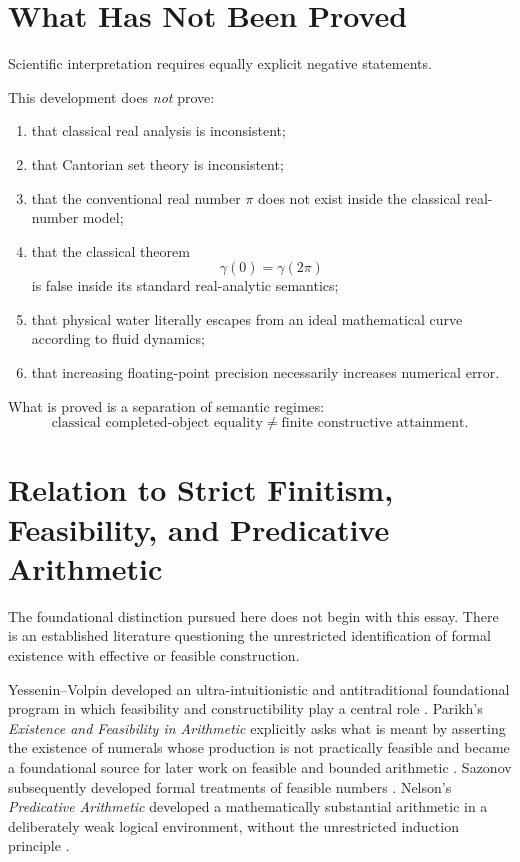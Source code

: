 \documentclass[11pt,a4paper]{article}
\begin{document}
\section{What Has Not Been Proved}

Scientific interpretation requires equally explicit negative statements.

This development does \emph{not} prove:

\begin{enumerate}[label=\arabic*.]
\item that classical real analysis is inconsistent;

\item that Cantorian set theory is inconsistent;

\item that the conventional real number $\pi$ does not exist inside the
      classical real-number model;

\item that the classical theorem
      \[
      \gamma(0)=\gamma(2\pi)
      \]
      is false inside its standard real-analytic semantics;

\item that physical water literally escapes from an ideal mathematical
      curve according to fluid dynamics;

\item that increasing floating-point precision necessarily increases
      numerical error.
\end{enumerate}

What is proved is a separation of semantic regimes:
\[
\boxed{
\text{classical completed-object equality}
\neq
\text{finite constructive attainment}.
}
\]




\section{Relation to Strict Finitism, Feasibility, and Predicative Arithmetic}
\label{sec:prior-ultrafinitist-literature}

The foundational distinction pursued here does not begin with this
essay.  There is an established literature questioning the unrestricted
identification of formal existence with effective or feasible
construction.

Yessenin--Volpin developed an ultra-intuitionistic and
antitraditional foundational program in which feasibility and
constructibility play a central role
\cite{YesseninVolpin1970}.
Parikh's \emph{Existence and Feasibility in Arithmetic} explicitly asks
what is meant by asserting the existence of numerals whose production
is not practically feasible and became a foundational source for later
work on feasible and bounded arithmetic
\cite{Parikh1971}.
Sazonov subsequently developed formal treatments of feasible numbers
\cite{Sazonov1995}.
Nelson's \emph{Predicative Arithmetic} developed a mathematically
substantial arithmetic in a deliberately weak logical environment,
without the unrestricted induction principle
\cite{Nelson1986}.
\end{document}
